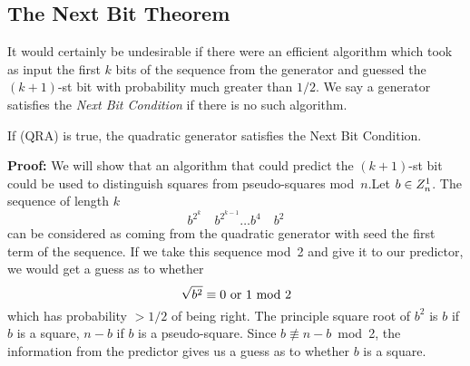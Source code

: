 \subsection{The Next Bit Theorem}
It would certainly be undesirable if there were an efficient algorithm
which took as input the first $k$ bits of the sequence from the generator
and guessed the $(k+1)$-st bit with probability much greater than $1/2$.
We say a generator satisfies the {\it Next Bit Condition\/} if there is
no such algorithm.\begin{Th}If (QRA) is true, the quadratic generator
satisfies the Next Bit Condition.\end{Th}{\bf Proof:} We will show that
an algorithm that could predict the $(k+1)$-st bit could be used to
distinguish squares from pseudo-squares mod~$n$.\pq Let $b\in Z^1_n$. The
sequence of length $k$ $$b^{2^k}\quad b^{2^{k-1}}\dots b^4\quad b^2$$
can be considered as coming from the quadratic generator with seed the
first term of the sequence.  If we take this sequence mod~2 and give
it to our predictor, we would get a guess as to whether $$\sqrt{b^2}\equiv0\hbox{ or }1\hbox{ mod }2$$which has probability $>1/2$ of being
right.  The principle square root of $b^2$ is $b$ if $b$ is a square,
$n-b$ if $b$ is a pseudo-square.  Since $b\not\equiv n-b$~mod~2, the
information from the predictor gives us a guess as to whether $b$ is
a square.
